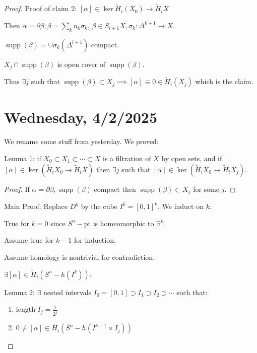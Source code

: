 \documentclass{article}
\theoremstyle{definition}
\begin{document}
\begin{proof}
        Proof of claim 2: \([\alpha] \in \ker \widetilde{H}_i(X_0) \to \widetilde{H}_i X\)


        Then \(\alpha = \partial \beta, \beta = \sum_{k} n_k \sigma_k\), \(\beta \in S_{i+1} X, \sigma_k : \Delta^{k+1} \to X\).

        \(\mathop{\mathrm{supp}}(\beta) = \cup \sigma_k(\Delta^{i+1})\) compact.
        
        \(X_j \cap \mathop{\mathrm{supp}}(\beta) \)  is open cover of \(\mathop{\mathrm{supp}}(\beta)\).

        Thus \(\exists j\) such that \(\mathop{\mathrm{supp}}(\beta) \subset X_j \implies [\alpha] \equiv 0 \in \widetilde{H}_{i} (X_j)\) which is the claim. 

        \section*{Wednesday, 4/2/2025}
    
        We rename some stuff from yesterday. We proved:

        Lemma 1: if \(X_0 \subset X_1 \subset \cdots \subset X\) is a filtration of \(X\) by open sets, and if \([\alpha] \in \ker (\widetilde{H}_i X_0 \to \widetilde{H}_i X)\) then \(\exists j\) such that \([\alpha] \in \ker (\widetilde{H}_i X_0 \to \widetilde{H}_i X_j)\).

        \begin{proof}
            If \(\alpha = \partial \beta, \mathop{\mathrm{supp}}(\beta)\) compact then \(\mathop{\mathrm{supp}}(\beta) \subset X_j\) for some \(j\). 
        \end{proof}

        Main Proof: Replace \(D^k\) by the cube \(I^k = [0,1]^k\). We induct on \(k\).

        True for \(k=0\) since \(S^n - \text{pt}\) is homeomorphic to \(\mathbb{R}^n\).

        Assume true for \(k-1\) for induction.

        Assume homology is nontrivial for contradiction.

        \(\exists [\alpha] \in \widetilde{H}_i (S^n - h(I^k))\).

        Lemma 2: \(\exists\) nested intervals \(I_0 = [0,1] \supset I_1 \supset I_2 \supset \cdots\) such that:
        
        \begin{enumerate}[label=\roman*)]
            \item length \(I_j = \frac{1}{2^j}\)
            \item \(0\neq [\alpha] \in \widetilde{H}_i (S^n - h(I^{k-1} \times I_j))\)
        \end{enumerate} 


\end{proof}
\end{document}
